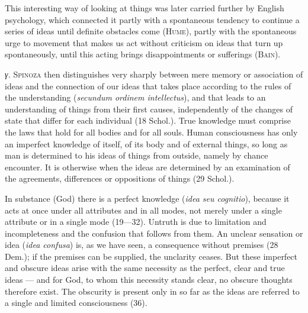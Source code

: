 \documentclass[12pt]{article}
\newcommand{\opage}[1]{\marginnote{\footnotesize\textit{[#1]}}}
\begin{document}
\opage{46}This interesting way of looking at things was later carried further by English
psychology, which connected it partly with a spontaneous tendency to continue a series of
ideas until definite obstacles come (\textsc{Hume}), partly with the spontaneous urge to
movement that makes us act without criticism on ideas that turn up spontaneously, until this
acting brings disappointments or sufferings (\textsc{Bain}).

\textit{γ.} \textsc{Spinoza} then distinguishes very sharply between mere memory or
association of ideas and the connection of our ideas that takes place according to the rules
of the understanding (\textit{secundum ordinem intellectus}), and that leads to an
understanding of things from their first causes, independently of the changes of state that
differ for each individual (18 Schol.). True knowledge must comprise the laws that hold for
all bodies and for all souls. Human consciousness has only an imperfect knowledge of itself,
of its body and of external things, so long as man is determined to his ideas of things from
outside, namely by chance encounter. It is otherwise when the ideas are determined by an
examination of the agreements, differences or oppositions of things (29 Schol.).

In substance (God) there is a perfect knowledge (\textit{idea seu cognitio}), because it
acts at once under all attributes and in all modes, not merely under a single attribute or
in a single mode (19---32). Untruth is due to limitation and incompleteness and the confusion
that follows from them. An unclear sensation or idea (\textit{idea confusa}) is, as we have
seen, a consequence without premises (28 Dem.); if the premises can be supplied, the
unclarity ceases. But these imperfect and obscure ideas arise with the same necessity as the
perfect, clear and true ideas --- and for God, to whom this necessity stands clear, no obscure
thoughts therefore exist. The obscurity is present only in so far as the ideas are referred
to a single and limited consciousness (36).
\end{document}
